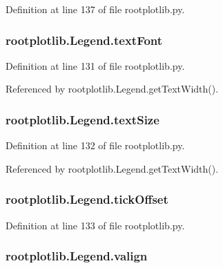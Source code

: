 Definition at line 137 of file rootplotlib.\-py.

\subsubsection[{text\-Font}]{\setlength{\rightskip}{0pt plus 5cm}rootplotlib.\-Legend.\-text\-Font}\label{classrootplotlib_1_1Legend_a57b3d113504e87d51e7a5ddb19761d3c}


Definition at line 131 of file rootplotlib.\-py.



Referenced by rootplotlib.\-Legend.\-get\-Text\-Width().

\subsubsection[{text\-Size}]{\setlength{\rightskip}{0pt plus 5cm}rootplotlib.\-Legend.\-text\-Size}\label{classrootplotlib_1_1Legend_a957b85a0c7755cd154d48ca25d870966}


Definition at line 132 of file rootplotlib.\-py.



Referenced by rootplotlib.\-Legend.\-get\-Text\-Width().

\subsubsection[{tick\-Offset}]{\setlength{\rightskip}{0pt plus 5cm}rootplotlib.\-Legend.\-tick\-Offset}\label{classrootplotlib_1_1Legend_ac9989003c1f57ee8f6decc94a5343a99}


Definition at line 133 of file rootplotlib.\-py.

\subsubsection[{valign}]{\setlength{\rightskip}{0pt plus 5cm}rootplotlib.\-Legend.\-valign}\label{classrootplotlib_1_1Legend_a47c64e257e44bbfaaf419a3f2e0b63cf}


